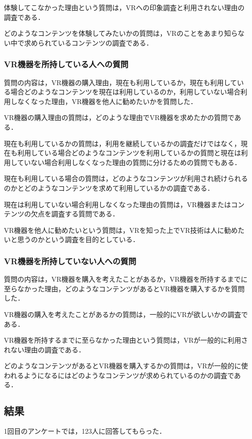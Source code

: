 \documentclass[12pt,a4j]{ltjsarticle}
\begin{document}
体験してこなかった理由という質問は，VRへの印象調査と利用されない理由の調査である．

どのようなコンテンツを体験してみたいかの質問は，VRのことをあまり知らない中で求められているコンテンツの調査である．

\subsubsection{VR機器を所持している人への質問}
質問の内容は，VR機器の購入理由，現在も利用しているか，現在も利用している場合どのようなコンテンツを現在は利用しているのか，利用していない場合利用しなくなった理由，VR機器を他人に勧めたいかを質問した．

VR機器の購入理由の質問は，どのような理由でVR機器を求めたかの質問である．

現在も利用しているかの質問は，利用を継続しているかの調査だけではなく，現在も利用している場合どのようなコンテンツを利用しているかの質問と現在は利用していない場合利用しなくなった理由の質問に分けるための質問でもある．

現在も利用している場合の質問は，どのようなコンテンツが利用され続けられるのかとどのようなコンテンツを求めて利用しているかの調査である．

現在は利用していない場合利用しなくなった理由の質問は，VR機器またはコンテンツの欠点を調査する質問である．

VR機器を他人に勧めたいという質問は，VRを知った上でVR技術は人に勧めたいと思うのかという調査を目的としている．

\subsubsection{VR機器を所持していない人への質問}
質問の内容は，VR機器を購入を考えたことがあるか，VR機器を所持するまでに至らなかった理由，どのようなコンテンツがあるとVR機器を購入するかを質問した．

VR機器の購入を考えたことがあるかの質問は，一般的にVRが欲しいかの調査である．

VR機器を所持するまでに至らなかった理由という質問は，VRが一般的に利用されない理由の調査である．

どのようなコンテンツがあるとVR機器を購入するかの質問は，VRが一般的に使われるようになるにはどのようなコンテンツが求められているのかの調査である．

\subsection{結果}
1回目のアンケートでは，123人に回答してもらった．
\end{document}
